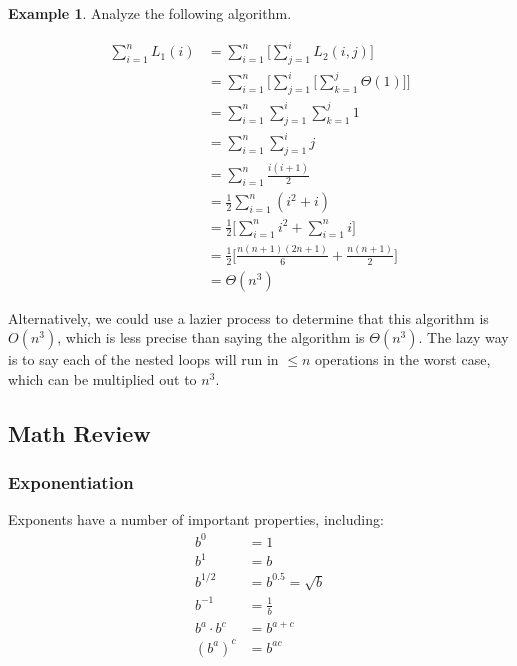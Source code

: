 \documentclass[]{article}
\theoremstyle{definition}
\newtheorem{ex}{Example}[section]
\newcommand{\lecture}[1]{\marginpar{{\footnotesize $\leftarrow$ \underline{#1}}}}
\begin{document}
			\begin{ex}
				\lecture{January 17, 2013}
				Analyze the following algorithm.
				\begin{algorithm}
				\end{algorithm}

				\begin{align*}
					\sum_{i = 1}^{n} L_1(i) &= \sum_{i = 1}^{n} \bigg[\sum_{j = 1}^{i} L_2(i, j)\bigg] \\
					&= \sum_{i = 1}^{n} \bigg[ \sum_{j = 1}^{i} \bigg[ \sum_{k = 1}^{j} \Theta(1) \bigg] \bigg] \\
					&= \sum_{i = 1}^{n} \sum_{j = 1}^{i} \sum_{k = 1}^{j} 1 \\
					&= \sum_{i = 1}^{n} \sum_{j = 1}^{i} j \\
					&= \sum_{i = 1}^{n} \frac{i(i+1)}{2} \\
					&= \frac{1}{2} \sum_{i = 1}^{n}(i^2 + i) \\
					&= \frac{1}{2} \bigg[ \sum_{i = 1}^{n} i^2 + \sum_{i = 1}^{n} i \bigg] \\
					&= \frac{1}{2} \bigg[ \frac{n(n+1)(2n+1)}{6} + \frac{n(n+1)}{2} \bigg] \\
					&= \Theta(n^3)
				\end{align*}

				Alternatively, we could use a lazier process to determine that this algorithm is $O(n^3)$, which is less precise than saying the algorithm is $\Theta(n^3)$. The lazy way is to say each of the nested loops will run in $\le n$ operations in the worst case, which can be multiplied out to $n^3$.
			\end{ex}

		\subsection{Math Review}
			\subsubsection{Exponentiation}
				Exponents have a number of important properties, including:
				\begin{align*}
					b^0 &= 1 \\
					b^1 &= b \\
					b^{1/2} &= b^{0.5} = \sqrt{b} \\
					b^{-1} &= \frac{1}{b} \\
					b^a \cdot b^c &= b^{a + c} \\
					(b^a)^c &= b^{ac}
				\end{align*}
\end{document}
